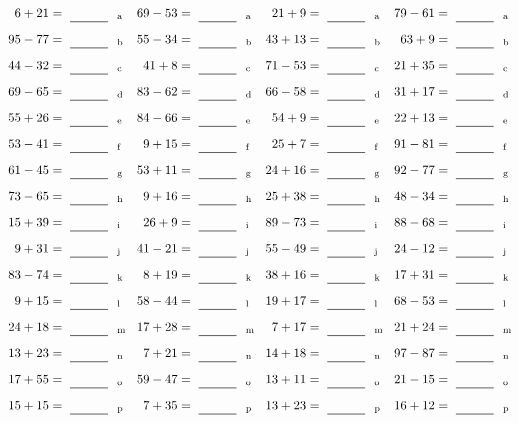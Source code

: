 \documentclass
[
  draft    = true,
  fontsize = 11pt,
  parskip  = half-
]
{scrartcl}
\begin{document}
\clearpage
\begin{align*}
    \pline{6+21}&=\rline{a}
  & \pline{69-53}&=\rline{a}
  & \pline{21+9}&=\rline{a}
  & \pline{79-61}&=\rline{a} \\[1ex]
    \pline{95-77}&=\rline{b}
  & \pline{55-34}&=\rline{b}
  & \pline{43+13}&=\rline{b}
  & \pline{63+9}&=\rline{b} \\[1ex]
    \pline{44-32}&=\rline{c}
  & \pline{41+8}&=\rline{c}
  & \pline{71-53}&=\rline{c}
  & \pline{21+35}&=\rline{c} \\[1ex]
    \pline{69-65}&=\rline{d}
  & \pline{83-62}&=\rline{d}
  & \pline{66-58}&=\rline{d}
  & \pline{31+17}&=\rline{d} \\[1ex]
    \pline{55+26}&=\rline{e}
  & \pline{84-66}&=\rline{e}
  & \pline{54+9}&=\rline{e}
  & \pline{22+13}&=\rline{e} \\[1ex]
    \pline{53-41}&=\rline{f}
  & \pline{9+15}&=\rline{f}
  & \pline{25+7}&=\rline{f}
  & \pline{91-81}&=\rline{f} \\[1ex]
    \pline{61-45}&=\rline{g}
  & \pline{53+11}&=\rline{g}
  & \pline{24+16}&=\rline{g}
  & \pline{92-77}&=\rline{g} \\[1ex]
    \pline{73-65}&=\rline{h}
  & \pline{9+16}&=\rline{h}
  & \pline{25+38}&=\rline{h}
  & \pline{48-34}&=\rline{h} \\[1ex]
    \pline{15+39}&=\rline{i}
  & \pline{26+9}&=\rline{i}
  & \pline{89-73}&=\rline{i}
  & \pline{88-68}&=\rline{i} \\[1ex]
    \pline{9+31}&=\rline{j}
  & \pline{41-21}&=\rline{j}
  & \pline{55-49}&=\rline{j}
  & \pline{24-12}&=\rline{j} \\[1ex]
    \pline{83-74}&=\rline{k}
  & \pline{8+19}&=\rline{k}
  & \pline{38+16}&=\rline{k}
  & \pline{17+31}&=\rline{k} \\[1ex]
    \pline{9+15}&=\rline{l}
  & \pline{58-44}&=\rline{l}
  & \pline{19+17}&=\rline{l}
  & \pline{68-53}&=\rline{l} \\[1ex]
    \pline{24+18}&=\rline{m}
  & \pline{17+28}&=\rline{m}
  & \pline{7+17}&=\rline{m}
  & \pline{21+24}&=\rline{m} \\[1ex]
    \pline{13+23}&=\rline{n}
  & \pline{7+21}&=\rline{n}
  & \pline{14+18}&=\rline{n}
  & \pline{97-87}&=\rline{n} \\[1ex]
    \pline{17+55}&=\rline{o}
  & \pline{59-47}&=\rline{o}
  & \pline{13+11}&=\rline{o}
  & \pline{21-15}&=\rline{o} \\[1ex]
    \pline{15+15}&=\rline{p}
  & \pline{7+35}&=\rline{p}
  & \pline{13+23}&=\rline{p}
  & \pline{16+12}&=\rline{p}
\end{align*}
\end{document}
